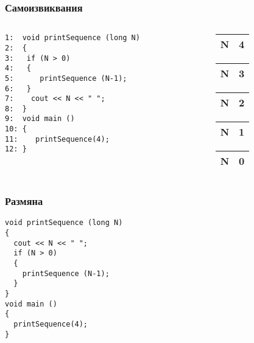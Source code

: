 \documentclass{beamer}
\begin{document}
\begin{frame}[fragile]
\frametitle{Самоизвиквания}



\begin{columns}[t]
  \begin{column}{0.8\textwidth}
\begin{lstlisting}
1:  void printSequence (long N)
2:  {
3:   if (N > 0)
4:   {
5:      printSequence (N-1);
6:   }
7:    cout << N << " ";
8:  }
9:  void main ()
10: {
11:    printSequence(4);
12: }
\end{lstlisting}
  \end{column}
  \begin{column}{0.2\textwidth}

\pause
    \begin{tabular}{|c|c|}
    N & 4 \\\hline
    \end{tabular}
    \pause
    \begin{tabular}{|c|c|}
    N & 3 \\\hline
    \end{tabular}
    \pause
    \begin{tabular}{|c|c|}
    N & 2 \\\hline
    \end{tabular}
    \pause
    \begin{tabular}{|c|c|}
    N & 1 \\\hline
    \end{tabular}
    \pause
    \begin{tabular}{|c|c|}
    N & 0 \\\hline
    \end{tabular}


  \end{column}
\end{columns}

\end{frame}


\begin{frame}[fragile]
\frametitle{Размяна}



\begin{lstlisting}
void printSequence (long N)
{
  cout << N << " ";
  if (N > 0)
  {
    printSequence (N-1);
  }
}
void main ()
{
  printSequence(4);
}
\end{lstlisting}
\end{frame}
\end{document}
